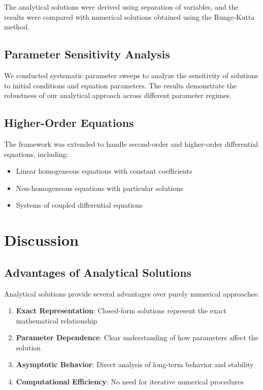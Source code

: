 \documentclass{article} %
\begin{document}
The analytical solutions were derived using separation of variables, and the results were compared with numerical solutions obtained using the Runge-Kutta method.

\subsection{Parameter Sensitivity Analysis}

We conducted systematic parameter sweeps to analyze the sensitivity of solutions to initial conditions and equation parameters. The results demonstrate the robustness of our analytical approach across different parameter regimes.

\subsection{Higher-Order Equations}

The framework was extended to handle second-order and higher-order differential equations, including:
\begin{itemize}
\item Linear homogeneous equations with constant coefficients
\item Non-homogeneous equations with particular solutions
\item Systems of coupled differential equations
\end{itemize}

\section{Discussion}

\subsection{Advantages of Analytical Solutions}

Analytical solutions provide several advantages over purely numerical approaches:

\begin{enumerate}
\item \textbf{Exact Representation}: Closed-form solutions represent the exact mathematical relationship
\item \textbf{Parameter Dependence}: Clear understanding of how parameters affect the solution
\item \textbf{Asymptotic Behavior}: Direct analysis of long-term behavior and stability
\item \textbf{Computational Efficiency}: No need for iterative numerical procedures
\end{enumerate}
\end{document}

